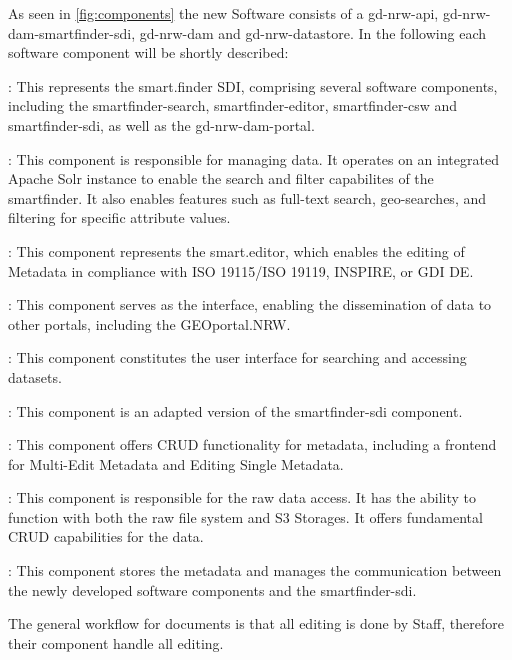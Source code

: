 \documentclass[11pt, titlepage, a4paper]{article}
\begin{document}
As seen in \ref{fig:components} the new Software consists of a gd-nrw-api, gd-nrw-dam-smartfinder-sdi, gd-nrw-dam and gd-nrw-datastore.
In the following each software component will be shortly described:
\begin{description}[]
	\item[gd-nrw-dam-smartfinder-sdi]: This represents the smart.finder SDI, comprising several software components, including the smartfinder-search, smartfinder-editor, smartfinder-csw and smartfinder-sdi, as well as the gd-nrw-dam-portal.
	      \begin{description}[]
		      \item[smartfinder-search]: This component is responsible for managing data. It operates on an integrated Apache Solr instance to enable the search and filter capabilites of the smartfinder. It also enables features such as full-text search, geo-searches, and filtering for specific attribute values.
		      \item[smartfinder-editor]: This component represents the smart.editor, which enables the editing of Metadata in compliance with ISO 19115/ISO 19119, INSPIRE, or GDI DE.
		      \item[smartfinder-csw]: This component serves as the  interface, enabling the dissemination of data to other portals, including the GEOportal.NRW.
		      \item[smartfinder-sdi]: This component constitutes the user interface for searching and accessing datasets.
		      \item[gd-nrw-dam-portal]: This component is an adapted version of the smartfinder-sdi component.
	      \end{description}
	\item[gd-nrw-dam]: This component offers CRUD functionality for metadata, including a frontend for Multi-Edit Metadata and Editing Single Metadata.
	\item[gd-nrw-datastore]: This component is responsible for the raw data access. It has the ability to function with both the raw file system and S3 Storages. It offers fundamental CRUD capabilities for the data.
	\item[gd-nrw-api]: This component stores the metadata and manages the communication between the newly developed software components and the smartfinder-sdi.
\end{description}
The general workflow for documents is that all editing is done by  Staff, therefore their component handle all editing.
\end{document}
